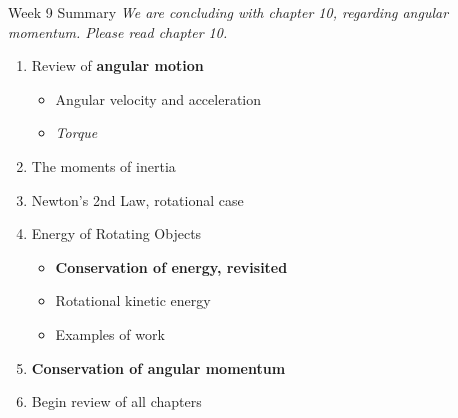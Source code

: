\documentclass{beamer}
\begin{document}
\begin{frame}{Week 9 Summary}
\textit{We are concluding with chapter 10, regarding angular momentum. Please read chapter 10.}
\begin{enumerate}
\item Review of \textbf{angular motion}
\begin{itemize}
\item Angular velocity and acceleration
\item \textit{Torque}
\end{itemize}
\item \alert{The moments of inertia}
\item Newton's 2nd Law, rotational case
\item Energy of Rotating Objects
\begin{itemize}
\item \textbf{Conservation of energy, revisited}
\item Rotational kinetic energy
\item Examples of work
\end{itemize}
\item \textbf{\alert{Conservation of angular momentum}}
\item Begin review of all chapters
\end{enumerate}
\end{frame}
\end{document}
